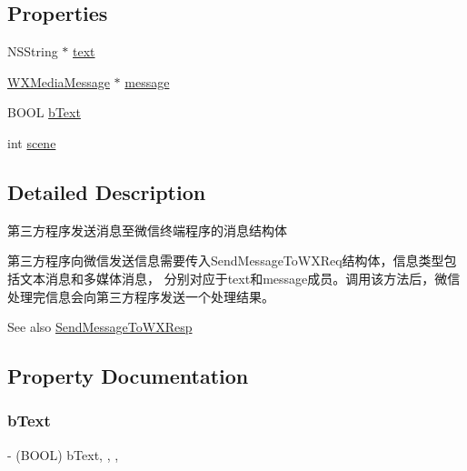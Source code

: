 \subsection*{Properties}
\begin{DoxyCompactItemize}
\item 
N\+S\+String $\ast$ \mbox{\hyperlink{interface_send_message_to_w_x_req_a483ee902e3c1f6b1748f886b197f2371}{text}}
\item 
\mbox{\hyperlink{interface_w_x_media_message}{W\+X\+Media\+Message}} $\ast$ \mbox{\hyperlink{interface_send_message_to_w_x_req_ab681e833acc946f6ecc42242347a992f}{message}}
\item 
B\+O\+OL \mbox{\hyperlink{interface_send_message_to_w_x_req_a1a44728c5eb41af902cef15ed0339f11}{b\+Text}}
\item 
int \mbox{\hyperlink{interface_send_message_to_w_x_req_a40e26a162d0611b30050b20dccf39d14}{scene}}
\end{DoxyCompactItemize}


\subsection{Detailed Description}
第三方程序发送消息至微信终端程序的消息结构体 

第三方程序向微信发送信息需要传入\+Send\+Message\+To\+W\+X\+Req结构体，信息类型包括文本消息和多媒体消息， 分别对应于text和message成员。调用该方法后，微信处理完信息会向第三方程序发送一个处理结果。 \begin{DoxySeeAlso}{See also}
\mbox{\hyperlink{interface_send_message_to_w_x_resp}{Send\+Message\+To\+W\+X\+Resp}} 
\end{DoxySeeAlso}


\subsection{Property Documentation}
\mbox{\label{interface_send_message_to_w_x_req_a1a44728c5eb41af902cef15ed0339f11}} 
\subsubsection{\texorpdfstring{b\+Text}{bText}}
{\footnotesize\ttfamily -\/ (B\+O\+OL) b\+Text\hspace{0.3cm}{\ttfamily [read]}, {\ttfamily [write]}, {\ttfamily [nonatomic]}, {\ttfamily [assign]}}

